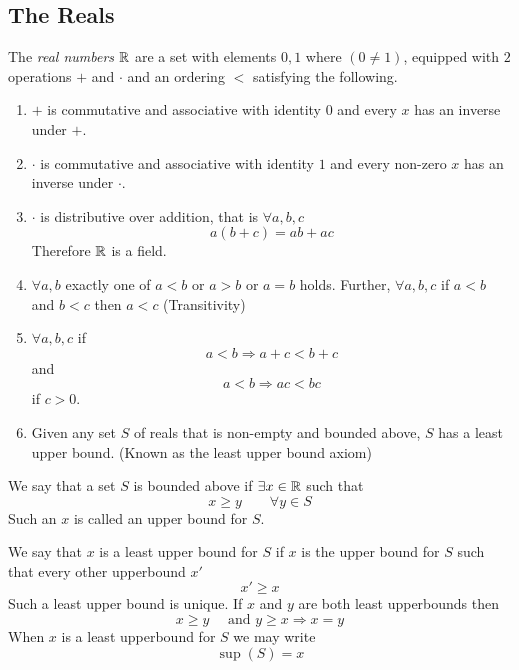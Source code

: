\documentclass{article}
\begin{document}
\subsection{The Reals}
\begin{defi}
    The \emph{real numbers} $\mathbb{R}$ are a set with elements $0, 1$ where $(0 \neq 1)$,
    equipped with $2$ operations $+$ and $\cdot$ and an ordering $<$ satisfying the following.
    \begin{enumerate}[label=(\arabic*)]
        \item $+$ is commutative and associative with identity $0$ and every $x$ has an inverse under $+$.
        \item $\cdot$ is commutative and associative with identity $1$ and every non-zero $x$ has an inverse under $\cdot$.
        \item $\cdot$ is distributive over addition, that is $\forall a, b, c$
        \[
            a(b + c) = ab + ac    
        \]
        Therefore $\mathbb{R}$ is a field.
        \item $\forall a, b$ exactly one of $a < b$ or $a > b$ or $a = b$ holds.
        Further, $\forall a, b, c$ if $a < b$ and $b < c$ then $a < c$ (Transitivity)
        \item $\forall a, b, c$ if 
        \[
            a < b \Rightarrow a + c < b + c
        \]
        and
        \[
            a < b \Rightarrow ac < bc  
        \]
        if $c > 0$.
        \item Given any set $S$ of reals that is non-empty and bounded above, $S$ has a least upper bound.
        (Known as the least upper bound axiom)
    \end{enumerate}
\end{defi}

\begin{defi}
    We say that a set $S$ is bounded above if $\exists x \in \mathbb{R}$ such that
    \[
        x \geq y \qquad \forall y \in S
    \]
    Such an $x$ is called an upper bound for $S$.
\end{defi}

\begin{defi}
    We say that $x$ is a least upper bound for $S$ if $x$ is the upper bound for $S$ such that every other upperbound $x'$
    \[
        x' \geq x
    \]
    Such a least upper bound is unique. If $x$ and $y$ are both least upperbounds then
    \[
        x \geq y \quad \text{ and } y \geq x \Rightarrow x = y
    \]
    When $x$ is a least upperbound for $S$ we may write
    \[
        \sup(S) = x  
    \]
\end{defi}
\end{document}
